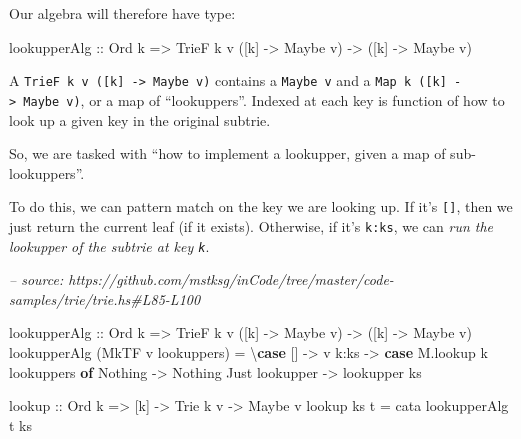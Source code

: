 \documentclass[]{article}
\newenvironment{Shaded}{}{}
\newcommand{\CommentTok}[1]{\textcolor[rgb]{0.38,0.63,0.69}{\textit{#1}}}
\newcommand{\DataTypeTok}[1]{\textcolor[rgb]{0.56,0.13,0.00}{#1}}
\newcommand{\FunctionTok}[1]{\textcolor[rgb]{0.02,0.16,0.49}{#1}}
\newcommand{\KeywordTok}[1]{\textcolor[rgb]{0.00,0.44,0.13}{\textbf{#1}}}
\newcommand{\NormalTok}[1]{#1}
\newcommand{\OtherTok}[1]{\textcolor[rgb]{0.00,0.44,0.13}{#1}}
\begin{document}
Our algebra will therefore have type:

\begin{Shaded}
\begin{Highlighting}[]
\NormalTok{lookupperAlg}
\OtherTok{    ::} \DataTypeTok{Ord}\NormalTok{ k}
    \OtherTok{=>} \DataTypeTok{TrieF}\NormalTok{ k v ([k] }\OtherTok{->} \DataTypeTok{Maybe}\NormalTok{ v)}
    \OtherTok{->}\NormalTok{ ([k] }\OtherTok{->} \DataTypeTok{Maybe}\NormalTok{ v)}
\end{Highlighting}
\end{Shaded}

A \texttt{TrieF\ k\ v\ ({[}k{]}\ -\textgreater{}\ Maybe\ v)} contains a
\texttt{Maybe\ v} and a \texttt{Map\ k\ ({[}k{]}\ -\textgreater{}\ Maybe\ v)},
or a map of ``lookuppers''. Indexed at each key is function of how to look up a
given key in the original subtrie.

So, we are tasked with ``how to implement a lookupper, given a map of
sub-lookuppers''.

To do this, we can pattern match on the key we are looking up. If it's
\texttt{{[}{]}}, then we just return the current leaf (if it exists). Otherwise,
if it's \texttt{k:ks}, we can \emph{run the lookupper of the subtrie at key
\texttt{k}}.

\begin{Shaded}
\begin{Highlighting}[]
\CommentTok{-- source: https://github.com/mstksg/inCode/tree/master/code-samples/trie/trie.hs#L85-L100}

\NormalTok{lookupperAlg}
\OtherTok{    ::} \DataTypeTok{Ord}\NormalTok{ k}
    \OtherTok{=>} \DataTypeTok{TrieF}\NormalTok{ k v ([k] }\OtherTok{->} \DataTypeTok{Maybe}\NormalTok{ v)}
    \OtherTok{->}\NormalTok{ ([k] }\OtherTok{->} \DataTypeTok{Maybe}\NormalTok{ v)}
\NormalTok{lookupperAlg (}\DataTypeTok{MkTF}\NormalTok{ v lookuppers) }\FunctionTok{=}\NormalTok{ \textbackslash{}}\KeywordTok{case}
\NormalTok{    []   }\OtherTok{->}\NormalTok{ v}
\NormalTok{    k}\FunctionTok{:}\NormalTok{ks }\OtherTok{->} \KeywordTok{case}\NormalTok{ M.lookup k lookuppers }\KeywordTok{of}
      \DataTypeTok{Nothing}        \OtherTok{->} \DataTypeTok{Nothing}
      \DataTypeTok{Just}\NormalTok{ lookupper }\OtherTok{->}\NormalTok{ lookupper ks}

\NormalTok{lookup}
\OtherTok{    ::} \DataTypeTok{Ord}\NormalTok{ k}
    \OtherTok{=>}\NormalTok{ [k]}
    \OtherTok{->} \DataTypeTok{Trie}\NormalTok{ k v}
    \OtherTok{->} \DataTypeTok{Maybe}\NormalTok{ v}
\NormalTok{lookup ks t }\FunctionTok{=}\NormalTok{ cata lookupperAlg t ks}
\end{Highlighting}
\end{Shaded}
\end{document}
